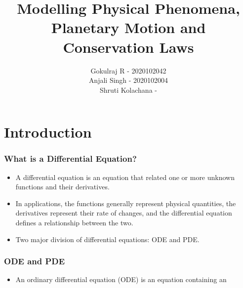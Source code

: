 \documentclass{beamer}
\title{Modelling Physical Phenomena, Planetary Motion and Conservation Laws}
\author{Gokulraj R - 2020102042 \\
Anjali Singh - 2020102004\\
Shruti Kolachana -
}
\begin{document}
\maketitle

\section{Introduction}

\begin{frame}
    \frametitle{What is a Differential Equation?}
    \begin{itemize}
        \item A differential equation is an equation that related one or more unknown functions and their derivatives.
        \item In applications, the functions generally represent physical quantities, the derivatives represent their rate of changes, and the differential equation defines a relationship between the two.
        \item Two major division of differential equations: ODE and PDE.
    \end{itemize}
\end{frame}

\begin{frame}
    \frametitle{ODE and PDE}
    \begin{itemize}
        \item An ordinary differential equation (ODE) is an equation containing an
    \end{itemize}
\end{frame}

\begin{frame}
    \frametitle{}
\end{frame}
\end{document}
